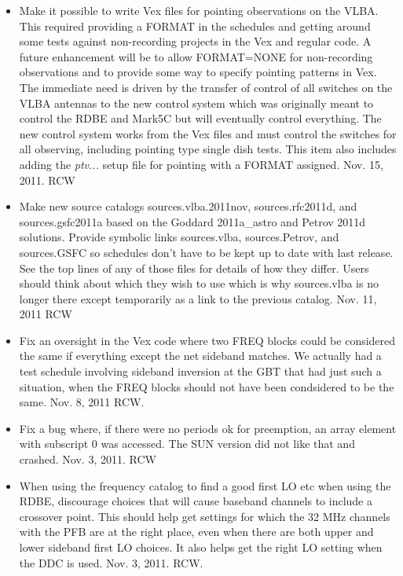 \documentclass{report}
\begin{document}
\begin{itemize}
\item Make it possible to write Vex files for pointing observations on
the VLBA.  This required providing a FORMAT in the schedules and
getting around some tests against non-recording projects in the Vex
and regular code.  A future enhancement will be to allow FORMAT=NONE
for non-recording observations and to provide some way to specify
pointing patterns in Vex.  The immediate need is driven by the
transfer of control of all switches on the VLBA antennas to the new
control system which was originally meant to control the RDBE and
Mark5C but will eventually control everything.  The new control system
works from the Vex files and must control the switches for all
observing, including pointing type single dish tests.  This item
also includes adding the {\sl ptv...} setup file for pointing with
a FORMAT assigned.  Nov. 15, 2011. RCW

\item Make new source catalogs sources.vlba.2011nov, sources.rfc2011d,
and sources.gsfc2011a based on the Goddard 2011a\_astro and Petrov
2011d solutions.  Provide symbolic links sources.vlba, sources.Petrov,
and sources.GSFC so schedules don't have to be kept up to date with
last release.  See the top lines of any of those files for details of
how they differ.  Users should think about which they wish to use
which is why sources.vlba is no longer there except temporarily as a
link to the previous catalog.  Nov. 11, 2011 RCW

\item Fix an oversight in the Vex code where two FREQ blocks could
be considered the same if everything except the net sideband matches.
We actually had a test schedule involving sideband inversion at the
GBT that had just such a situation, when the FREQ blocks should
not have been condsidered to be the same.  Nov. 8, 2011  RCW.

\item Fix a bug where, if there were no periods ok for preemption,
an array element with subscript 0 was accessed.  The SUN version
did not like that and crashed.  Nov. 3, 2011.  RCW

\item When using the frequency catalog to find a good first LO etc
when using the RDBE, discourage choices that will cause baseband 
channels to include a crossover point.  This should help get settings
for which the 32 MHz channels with the PFB are at the right place, 
even when there are both upper and lower sideband first LO choices.
It also helps get the right LO setting when the DDC is used.  Nov. 3,
2011.  RCW.


\end{itemize}
\end{document}
